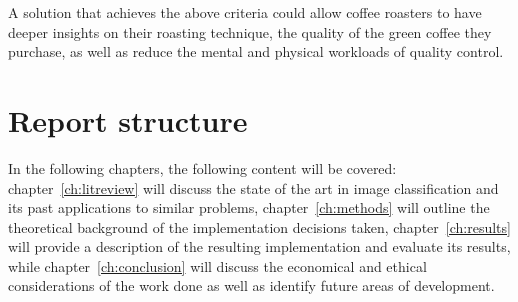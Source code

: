 A solution that achieves the above criteria could allow coffee roasters to have
deeper insights on their roasting technique, the quality of the green coffee they
purchase, as well as reduce the mental and physical workloads of quality control.

\section{Report structure}
\label{sec:report-structure}
In the following chapters, the following content will be covered: chapter~\ref{ch:litreview} will discuss the state of the art
in image classification and its past applications to similar problems, chapter~\ref{ch:methods} will outline the theoretical background
of the implementation decisions taken, chapter~\ref{ch:results} will provide a description of the resulting implementation and evaluate
its results, while chapter~\ref{ch:conclusion} will discuss the economical and ethical considerations of the work done as well as identify future
areas of development.